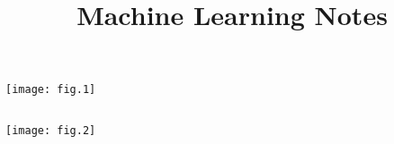 \documentclass{article}
\title{Machine Learning Notes}
\begin{document}

\subsection{}
\texttt{[image: fig.1]}

\subsection{}
\texttt{[image: fig.2]}

\end{document}
